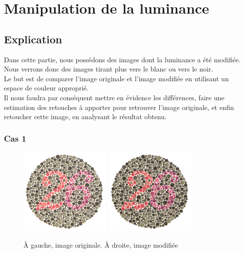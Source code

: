 \documentclass[a4paper]{article}
\begin{document}
\clearpage

\section{Manipulation de la luminance}

\subsection{Explication}

Dans cette partie, nous possédons des images dont la luminance a été modifiée. Nous verrons donc des images tirant plus vers le blanc ou vers le noir.\\
Le but est de comparer l'image originale et l'image modifiée en utilisant un espace de couleur approprié.\\
Il nous faudra par conséquent mettre en évidence les différences, faire une estimation des retouches à apporter pour retrouver l'image originale, et enfin retoucher cette image, en analysant le résultat obtenu.

\subsubsection{Cas 1}

\begin{figure}[H]
\begin{center}
\includegraphics[width=170px]{../base/cas_1_dalton26.png}
\includegraphics[width=170px]{../base/cas_1_luminance.png}
\end{center}
\caption{À gauche, image originale. À droite, image modifiée}
\end{figure}
\end{document}
